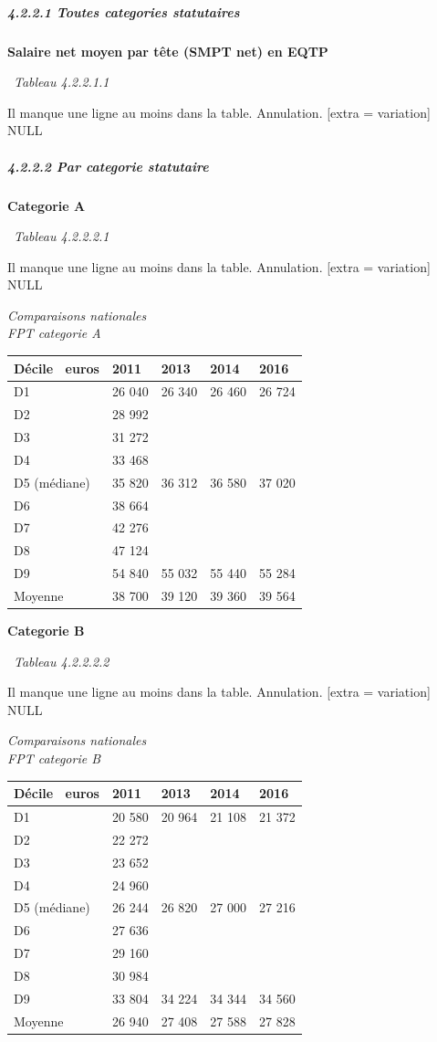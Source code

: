 \hypertarget{toutes-categories-statutaires}{%
\subparagraph{4.2.2.1 Toutes categories
statutaires}\label{toutes-categories-statutaires}}

\textbf{Salaire net moyen par tête (SMPT net) en EQTP}

~\emph{Tableau 4.2.2.1.1}

Il manque une ligne au moins dans la table. Annulation. {[}extra =
variation{]}\\
NULL

\hypertarget{par-categorie-statutaire}{%
\subparagraph{4.2.2.2 Par categorie
statutaire}\label{par-categorie-statutaire}}

\textbf{Categorie A}

~\emph{Tableau 4.2.2.2.1}

Il manque une ligne au moins dans la table. Annulation. {[}extra =
variation{]}\\
NULL

\emph{Comparaisons nationales}\\
\emph{FPT categorie A}

\begin{longtable}[]{@{}lllll@{}}
\toprule
Décile ~euros & 2011 & 2013 & 2014 & 2016\tabularnewline
\midrule
\endhead
D1 & 26 040 & 26 340 & 26 460 & 26 724\tabularnewline
D2 & 28 992 & & &\tabularnewline
D3 & 31 272 & & &\tabularnewline
D4 & 33 468 & & &\tabularnewline
D5 (médiane) & 35 820 & 36 312 & 36 580 & 37 020\tabularnewline
D6 & 38 664 & & &\tabularnewline
D7 & 42 276 & & &\tabularnewline
D8 & 47 124 & & &\tabularnewline
D9 & 54 840 & 55 032 & 55 440 & 55 284\tabularnewline
Moyenne & 38 700 & 39 120 & 39 360 & 39 564\tabularnewline
\bottomrule
\end{longtable}

\textbf{Categorie B}

~\emph{Tableau 4.2.2.2.2}

Il manque une ligne au moins dans la table. Annulation. {[}extra =
variation{]}\\
NULL

\emph{Comparaisons nationales}\\
\emph{FPT categorie B}

\begin{longtable}[]{@{}lllll@{}}
\toprule
Décile ~euros & 2011 & 2013 & 2014 & 2016\tabularnewline
\midrule
\endhead
D1 & 20 580 & 20 964 & 21 108 & 21 372\tabularnewline
D2 & 22 272 & & &\tabularnewline
D3 & 23 652 & & &\tabularnewline
D4 & 24 960 & & &\tabularnewline
D5 (médiane) & 26 244 & 26 820 & 27 000 & 27 216\tabularnewline
D6 & 27 636 & & &\tabularnewline
D7 & 29 160 & & &\tabularnewline
D8 & 30 984 & & &\tabularnewline
D9 & 33 804 & 34 224 & 34 344 & 34 560\tabularnewline
Moyenne & 26 940 & 27 408 & 27 588 & 27 828\tabularnewline
\bottomrule
\end{longtable}

